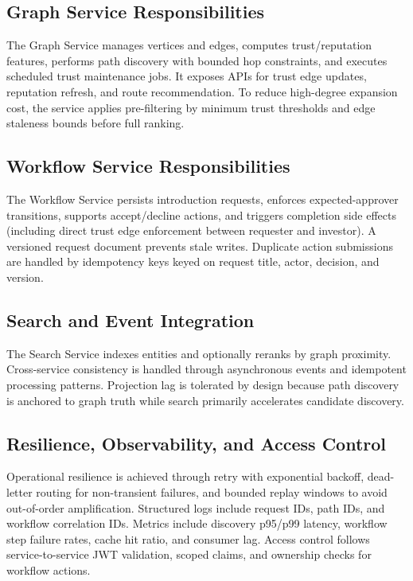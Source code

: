 \documentclass[conference]{IEEEtran}
\begin{document}
\subsection{Graph Service Responsibilities}
The Graph Service manages vertices and edges, computes trust/reputation features, performs path discovery with bounded hop constraints, and executes scheduled trust maintenance jobs. It exposes APIs for trust edge updates, reputation refresh, and route recommendation. To reduce high-degree expansion cost, the service applies pre-filtering by minimum trust thresholds and edge staleness bounds before full ranking.

\subsection{Workflow Service Responsibilities}
The Workflow Service persists introduction requests, enforces expected-approver transitions, supports accept/decline actions, and triggers completion side effects (including direct trust edge enforcement between requester and investor). A versioned request document prevents stale writes. Duplicate action submissions are handled by idempotency keys keyed on request title, actor, decision, and version.

\subsection{Search and Event Integration}
The Search Service indexes entities and optionally reranks by graph proximity. Cross-service consistency is handled through asynchronous events and idempotent processing patterns. Projection lag is tolerated by design because path discovery is anchored to graph truth while search primarily accelerates candidate discovery.

\subsection{Resilience, Observability, and Access Control}
Operational resilience is achieved through retry with exponential backoff, dead-letter routing for non-transient failures, and bounded replay windows to avoid out-of-order amplification. Structured logs include request IDs, path IDs, and workflow correlation IDs. Metrics include discovery p95/p99 latency, workflow step failure rates, cache hit ratio, and consumer lag. Access control follows service-to-service JWT validation, scoped claims, and ownership checks for workflow actions.
\end{document}
